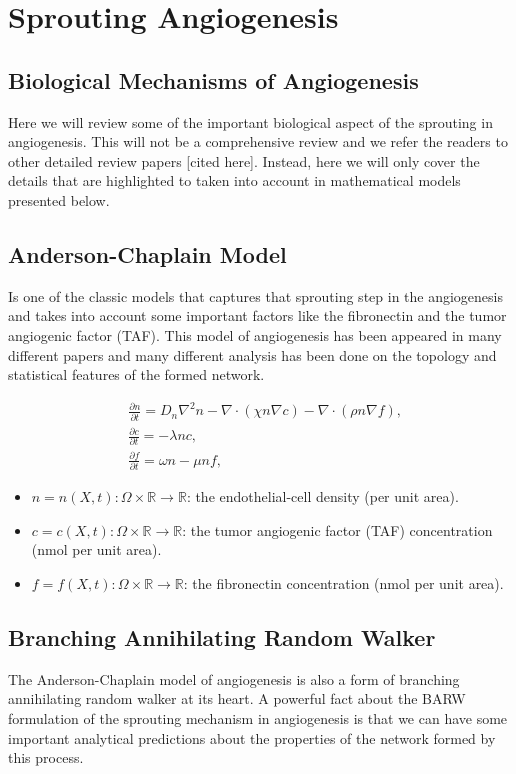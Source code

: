 \documentclass[10pt,a4paper,twocolumn]{article}
\newcommand{\R}{\mathbb{R}}
\begin{document}
	\section{Sprouting Angiogenesis}
	\subsection{Biological Mechanisms of Angiogenesis}
	Here we will review some of the important biological aspect of the sprouting in angiogenesis. This will not be a comprehensive review and we refer the readers to other detailed review papers [cited here]. Instead, here we will only cover the details that are highlighted to taken into account in mathematical models presented below.
	
	\subsection{Anderson-Chaplain Model}
	Is one of the classic models that captures that sprouting step in the angiogenesis and takes into account some important factors like the fibronectin and the tumor angiogenic factor (TAF). This model of angiogenesis has been appeared in many different papers and many different analysis has been done on the topology and statistical features of the formed network.
	
	\begin{align*}
		&\frac{\partial n}{\partial t} =  D_n\nabla^2 n  - \nabla\cdot(\chi n\nabla c) - \nabla\cdot(\rho n \nabla f), \\
		&\frac{\partial c}{\partial t} = -\lambda n c, \\
		&\frac{\partial f}{\partial t} = \omega n - \mu n f,
	\end{align*}
	
	\begin{itemize}
		\item $ n = n(X,t): \Omega \times \R \to \R $: the endothelial-cell density (per unit area).
		\item $ c = c(X,t): \Omega \times \R \to \R $: the tumor angiogenic factor (TAF) concentration (nmol per unit area).
		\item $ f = f(X,t): \Omega \times \R \to \R $: the fibronectin concentration (nmol per unit area).
	\end{itemize}
	
	\subsection{Branching Annihilating Random Walker}
	The Anderson-Chaplain model of angiogenesis is also a form of branching annihilating random walker at its heart. A powerful fact about the BARW formulation of the sprouting mechanism in angiogenesis is that we can have some important analytical predictions about the properties of the network formed by this process.
	
\end{document}

